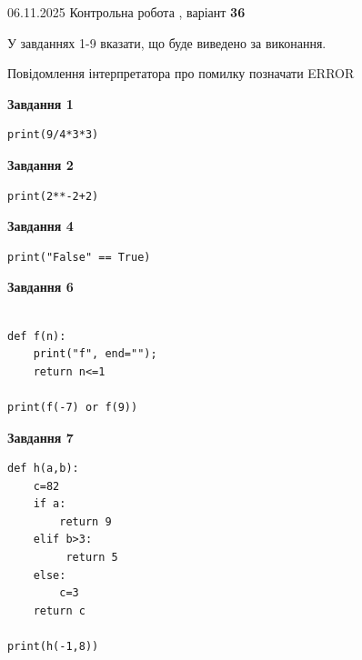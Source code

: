 \documentclass[12pt, ukrainian]{article}
\begin{document}
{\Large{06.11.2025 Контрольна робота , варіант  \No \textbf { 36 }\par}}
{
\begin {large}
У завданнях 1-9 вказати, що буде виведено за виконання.

Повідомлення інтерпретатора про помилку позначати ERROR

\begin{minipage}[t]{7.5cm}

\begin{center}
\textbf{Завдання 1}
\end{center}

\begin{verbatim}
print(9/4*3*3)
\end{verbatim}



\begin{center}
\textbf{Завдання 2}
\end{center}

\begin{verbatim}
print(2**-2+2)
\end{verbatim}



\begin{center}
\textbf{Завдання 4}
\end{center}

\begin{verbatim}
print("False" == True)
\end{verbatim}



\begin{center}
\textbf{Завдання 6}
\end{center}

\begin{verbatim}

def f(n):
    print("f", end="");
    return n<=1

print(f(-7) or f(9))
\end{verbatim}



\begin{center}
\textbf{Завдання 7}
\end{center}

\begin{verbatim}
def h(a,b):
    c=82
    if a:
        return 9
    elif b>3:
         return 5
    else: 
        c=3
    return c

print(h(-1,8))
\end{verbatim}


\end{minipage}
\end{large}}
\end{document}
